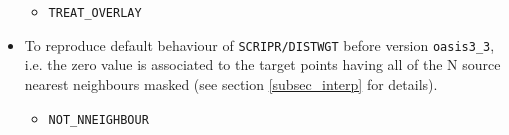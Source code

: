 \begin{itemize}
  \begin{itemize}
  \item {\tt TREAT\_OVERLAY}
  \end{itemize} 

\item To reproduce default behaviour of {\tt SCRIPR/DISTWGT} before
  version {\tt oasis3\_3}, i.e. the zero value is associated to the
  target points having all of the N source nearest neighbours masked
  (see section \ref{subsec_interp} for details).
  \begin{itemize}
  \item {\tt NOT\_NNEIGHBOUR}
  \end{itemize} 
  
%




\end{itemize}
